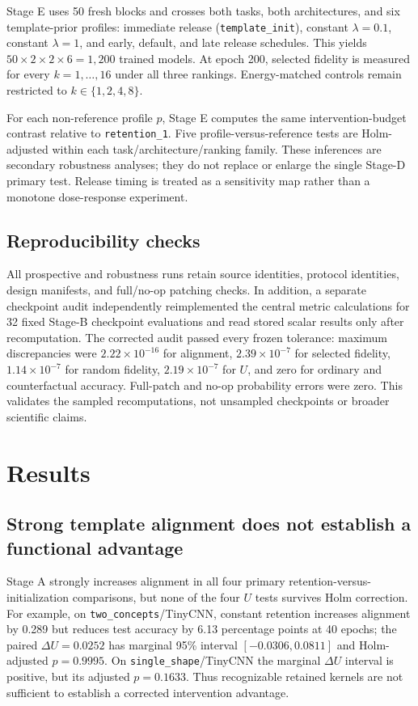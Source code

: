 \documentclass[10pt]{article}
\begin{document}
Stage E uses 50 fresh blocks and crosses both tasks, both architectures, and six template-prior profiles: immediate release (\texttt{template\_init}), constant $\lambda=0.1$, constant $\lambda=1$, and early, default, and late release schedules. This yields $50\times2\times2\times6=1{,}200$ trained models. At epoch 200, selected fidelity is measured for every $k=1,\ldots,16$ under all three rankings. Energy-matched controls remain restricted to $k\in\{1,2,4,8\}$.

For each non-reference profile $p$, Stage E computes the same intervention-budget contrast relative to \texttt{retention\_1}. Five profile-versus-reference tests are Holm-adjusted within each task/architecture/ranking family. These inferences are secondary robustness analyses; they do not replace or enlarge the single Stage-D primary test. Release timing is treated as a sensitivity map rather than a monotone dose-response experiment.

\subsection{Reproducibility checks}\label{sec:audit}

All prospective and robustness runs retain source identities, protocol identities, design manifests, and full/no-op patching checks. In addition, a separate checkpoint audit independently reimplemented the central metric calculations for 32 fixed Stage-B checkpoint evaluations and read stored scalar results only after recomputation. The corrected audit passed every frozen tolerance: maximum discrepancies were $2.22\times10^{-16}$ for alignment, $2.39\times10^{-7}$ for selected fidelity, $1.14\times10^{-7}$ for random fidelity, $2.19\times10^{-7}$ for $U$, and zero for ordinary and counterfactual accuracy. Full-patch and no-op probability errors were zero. This validates the sampled recomputations, not unsampled checkpoints or broader scientific claims.

\section{Results}\label{sec:results}

\subsection{Strong template alignment does not establish a functional advantage}\label{sec:stage-a-results}

Stage A strongly increases alignment in all four primary retention-versus-initialization comparisons, but none of the four $U$ tests survives Holm correction. For example, on \texttt{two\_concepts}/TinyCNN, constant retention increases alignment by 0.289 but reduces test accuracy by 6.13 percentage points at 40 epochs; the paired $\Delta U=0.0252$ has marginal 95\% interval $[-0.0306,0.0811]$ and Holm-adjusted $p=0.9995$. On \texttt{single\_shape}/TinyCNN the marginal $\Delta U$ interval is positive, but its adjusted $p=0.1633$. Thus recognizable retained kernels are not sufficient to establish a corrected intervention advantage.
\end{document}

